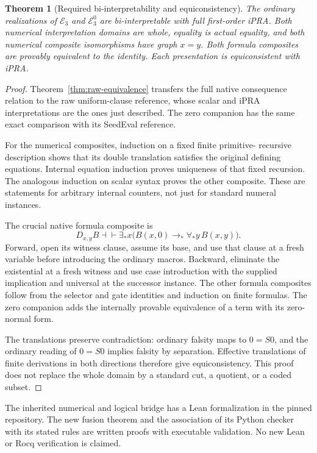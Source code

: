 \documentclass[11pt,letterpaper]{article}
\newtheorem{theorem}{Theorem}[section]
\theoremstyle{definition}\newtheorem{definition}[theorem]{Definition}
\theoremstyle{remark}\newtheorem{remark}[theorem]{Remark}
\begin{document}
\begin{theorem}[Required bi-interpretability and equiconsistency]
\label{thm:biinterp}
The ordinary realizations of $\mathcal E_3$ and $\mathcal E^0_3$ are
bi-interpretable with full first-order iPRA. Both numerical interpretation
domains are whole, equality is actual equality, and both numerical
composite isomorphisms have graph $x=y$. Both formula composites are
provably equivalent to the identity. Each presentation is equiconsistent
with iPRA.
\end{theorem}
\begin{proof}
Theorem~\ref{thm:raw-equivalence} transfers the full native consequence
relation to the raw uniform-clause reference, whose scalar and iPRA
interpretations are the ones just described. The zero companion has the
same exact comparison with its SeedEval reference.

For the numerical composites, induction on a fixed finite primitive-
recursive description shows that its double translation satisfies the
original defining equations. Internal equation induction proves uniqueness
of that fixed recursion. The analogous induction on scalar syntax proves
the other composite. These are statements for arbitrary internal counters,
not just for standard numeral instances.

The crucial native formula composite is
\[
 D_{x,y}B\dashv\vdash
 \exists_*x\bigl(B(x,0)\to_*\forall_*y\,B(x,y)\bigr).
\]
Forward, open its witness clause, assume its base, and use that clause
at a fresh variable before introducing the ordinary macros. Backward,
eliminate the existential at a fresh witness and use case introduction
with the supplied implication and universal at the successor instance.
The other formula composites follow from the selector and gate identities
and induction on finite formulas. The zero companion adds the internally
provable equivalence of a term with its zero-normal form.

The translations preserve contradiction: ordinary falsity maps to
$0=S0$, and the ordinary reading of $0=S0$ implies falsity by separation.
Effective translations of finite derivations in both directions therefore
give equiconsistency. This proof does not replace the whole domain by a
standard cut, a quotient, or a coded subset.
\end{proof}

The inherited numerical and logical bridge has a Lean formalization in
the pinned repository. The new fusion theorem and the association of its
Python checker with its stated rules are written proofs with executable
validation. No new Lean or Rocq verification is claimed.
\end{document}
